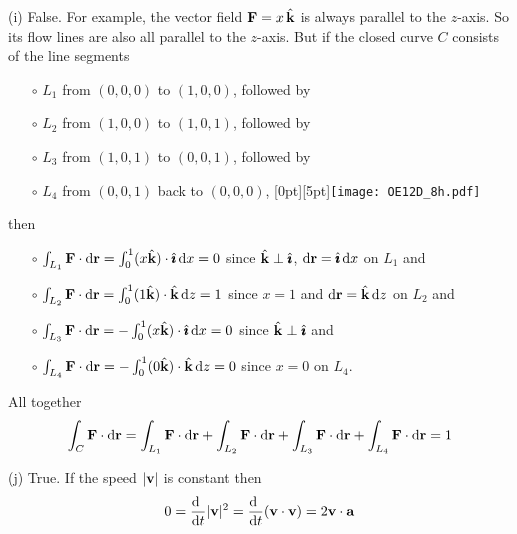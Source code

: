 \begin{solution}
\noindent (i)
False. For example, the vector field $\mathbf{F} = x\,\hat{\mathbf{k}}$ is always parallel to the 
$z$-axis. So its flow lines are also all parallel to the $z$-axis.
But if the closed curve $C$ consists of the line segments
\begin{itemize}\itemsep1pt \parskip0pt  %
\item[$\circ$]
$L_1$ from $(0,0,0)$ to $(1,0,0)$, followed by
\item[$\circ$]
$L_2$ from $(1,0,0)$ to $(1,0,1)$, followed by
\item[$\circ$]
$L_3$ from $(1,0,1)$ to $(0,0,1)$, followed by
\item[$\circ$]
$L_4$ from $(0,0,1)$ back to $(0,0,0)$,
\hskip1.0in
\raisebox{-25pt}[0pt][5pt]{\texttt{[image: OE12D\_8h.pdf]}}
\end{itemize} 
then
\begin{itemize}\itemsep1pt \parskip0pt  %
\item[$\circ$]
$\int_{L_1} \mathbf{F}\cdot\mathrm{d}\mathbf{r} = \int_0^1 (x\hat{\mathbf{k}})\cdot\hat{\pmb{\imath}}\,\mathrm{d}x = 0$
since $\hat{\mathbf{k}}\perp\hat{\pmb{\imath}}$, $\mathrm{d}\mathbf{r}=\hat{\pmb{\imath}}\,\mathrm{d}x$ on $L_1$ and
\item[$\circ$]
$\int_{L_2} \mathbf{F}\cdot\mathrm{d}\mathbf{r} = \int_0^1 (1\hat{\mathbf{k}})\cdot\hat{\mathbf{k}}\,\mathrm{d}z = 1$
since $x=1$ and $\mathrm{d}\mathbf{r}=\hat{\mathbf{k}}\,\mathrm{d}z$ on $L_2$ and
\item[$\circ$]
$\int_{L_3} \mathbf{F}\cdot\mathrm{d}\mathbf{r} = -\int_0^1 (x\hat{\mathbf{k}})\cdot\hat{\pmb{\imath}}\,\mathrm{d}x = 0$
since $\hat{\mathbf{k}}\perp\hat{\pmb{\imath}}$ and
\item[$\circ$]
$\int_{L_4} \mathbf{F}\cdot\mathrm{d}\mathbf{r} = -\int_0^1 (0\hat{\mathbf{k}})\cdot\hat{\mathbf{k}}\,\mathrm{d}z = 0$
since $x=0$ on $L_4$.
\end{itemize} 
All together
\begin{equation*}
\int_{C} \mathbf{F}\cdot\mathrm{d}\mathbf{r}
=\int_{L_1} \mathbf{F}\cdot\mathrm{d}\mathbf{r}
+\int_{L_2} \mathbf{F}\cdot\mathrm{d}\mathbf{r}
+\int_{L_3} \mathbf{F}\cdot\mathrm{d}\mathbf{r}
+\int_{L_4} \mathbf{F}\cdot\mathrm{d}\mathbf{r}
=1
\end{equation*}


\noindent (j) 
True. If the speed $|\mathbf{v}|$ is constant then
\begin{align*}
0= \diff{\hfill}{t} |\vv|^2
= \diff{\hfill}{t} (\vv\cdot\vv)
= 2\vv\cdot\va
\end{align*}


\end{solution}


